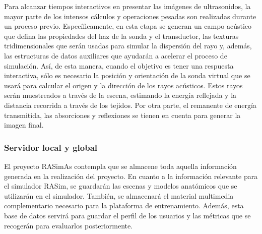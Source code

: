 Para alcanzar tiempos interactivos en presentar las imágenes de ultrasonidos, la mayor parte de los intensos cálculos y operaciones pesadas son realizadas durante un proceso previo. Específicamente, en esta etapa se generan un campo acústico que defina las propiedades del haz de la sonda y el transductor, las texturas tridimensionales que serán usadas para simular la dispersión del rayo y, además, las estructuras de datos auxiliares que ayudarán a acelerar el proceso de simulación.
Así, de esta manera, cuando el objetivo es tener una respuesta interactiva, sólo es necesario la posición y orientación de la sonda virtual que se usará para calcular el origen y la dirección de los rayos acústicos. Estos rayos serán muestreados a través de la escena, estimando la energía reflejada y la distancia recorrida a través de los tejidos. Por otra parte, el remanente de energía transmitida, las absorciones y reflexiones se tienen en cuenta para generar la imagen final.











\subsubsection{Servidor local y global}

El proyecto \ac{RASimAs} contempla que se almacene toda aquella información generada en la realización del proyecto. En cuanto a la información relevante para el simulador \ac{RASim}, se guardarán las escenas y modelos anatómicos que se utilizarán en el simulador. También, se almacenará el material multimedia complementario necesario para la plataforma de entrenamiento. Además, esta base de datos servirá para guardar el perfil de los usuarios y las métricas que se recogerán para evaluarlos posteriormente.

